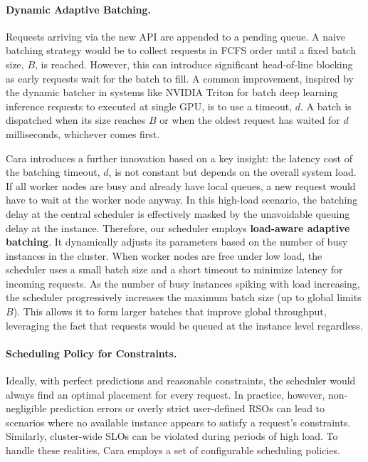 \documentclass[letterpaper, anonymous, twocolumn, 10pt]{article}
\begin{document}
\paragraph{Dynamic Adaptive Batching.}
Requests arriving via the new API are appended to a pending queue. A naive batching strategy would be to collect requests in FCFS order until a fixed batch size, $B$, is reached. However, this can introduce significant head-of-line blocking as early requests wait for the batch to fill. A common improvement, inspired by the dynamic batcher in systems like NVIDIA Triton \cite{nvidiaTritonArchitecture} for batch deep learning inference requests to executed at single GPU, is to use a timeout, $d$. A batch is dispatched when its size reaches $B$ or when the oldest request has waited for $d$ milliseconds, whichever comes first.

Cara introduces a further innovation based on a key insight: the latency cost of the batching timeout, $d$, is not constant but depends on the overall system load. If all worker nodes are busy and already have local queues, a new request would have to wait at the worker node anyway. In this high-load scenario, the batching delay at the central scheduler is effectively masked by the unavoidable queuing delay at the instance. Therefore, our scheduler employs \textbf{load-aware adaptive batching}. It dynamically adjusts its parameters based on the number of busy instances in the cluster. When worker nodes are free under low load, the scheduler uses a small batch size and a short timeout to minimize latency for incoming requests. As the number of busy instances spiking with load increasing, the scheduler progressively increases the maximum batch size (up to global limits $B$). This allows it to form larger batches that improve global throughput, leveraging the fact that requests would be queued at the instance level regardless.

\paragraph{Scheduling Policy for Constraints.}
Ideally, with perfect predictions and reasonable constraints, the scheduler would always find an optimal placement for every request. In practice, however, non-negligible prediction errors or overly strict user-defined RSOs can lead to scenarios where no available instance appears to satisfy a request's constraints. Similarly, cluster-wide SLOs can be violated during periods of high load. To handle these realities, Cara employs a set of configurable scheduling policies.
\end{document}
